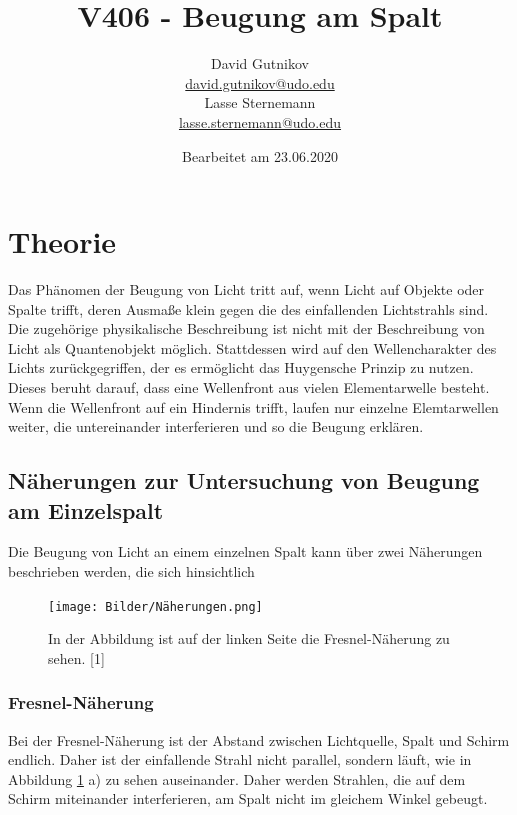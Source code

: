 \documentclass[titlepage = firstcover]{scrartcl}
\title{V406 - Beugung am Spalt}
\author{
  David Gutnikov\\
  \href{mailto:david.gutnikov@udo.edu}{david.gutnikov@udo.edu}\\
  Lasse Sternemann\\
  \href{mailto:lasse.sternemann@udo.edu}{lasse.sternemann@udo.edu}
}
\date{Bearbeitet am 23.06.2020}
\begin{document}
    \maketitle
    \newpage
    \tableofcontents
    \newpage

    \section{Theorie}
        Das Phänomen der Beugung von Licht tritt auf, wenn Licht auf Objekte oder Spalte trifft, deren Ausmaße klein gegen die des einfallenden Lichtstrahls sind. Die zugehörige physikalische
        Beschreibung ist nicht mit der Beschreibung von Licht als Quantenobjekt möglich. Stattdessen wird auf den Wellencharakter des Lichts zurückgegriffen, der es ermöglicht das Huygensche
        Prinzip zu nutzen. Dieses beruht darauf, dass eine Wellenfront aus vielen Elementarwelle besteht. Wenn die Wellenfront auf ein Hindernis trifft, laufen nur einzelne Elemtarwellen weiter,
        die untereinander interferieren und so die Beugung erklären.

        \subsection{Näherungen zur Untersuchung von Beugung am Einzelspalt}
            Die Beugung von Licht an einem einzelnen Spalt kann über zwei Näherungen beschrieben werden, die sich hinsichtlich
            \FloatBarrier

            \begin{figure}[h]
              \centering
              \texttt{[image: Bilder/Näherungen.png]}
              \caption{In der Abbildung ist auf der linken Seite die Fresnel-Näherung zu sehen. [1]}
              \label{fig:Näherungen}
            \end{figure}

            \FloatBarrier

            \noindent
            \subsubsection*{Fresnel-Näherung}
                Bei der Fresnel-Näherung ist der Abstand zwischen Lichtquelle, Spalt und Schirm endlich. Daher ist der einfallende Strahl nicht parallel, sondern läuft, wie in Abbildung 
                \ref{fig:Näherungen} a) zu sehen auseinander. Daher werden Strahlen, die auf dem Schirm miteinander interferieren, am Spalt nicht im gleichem Winkel gebeugt.
\end{document}

